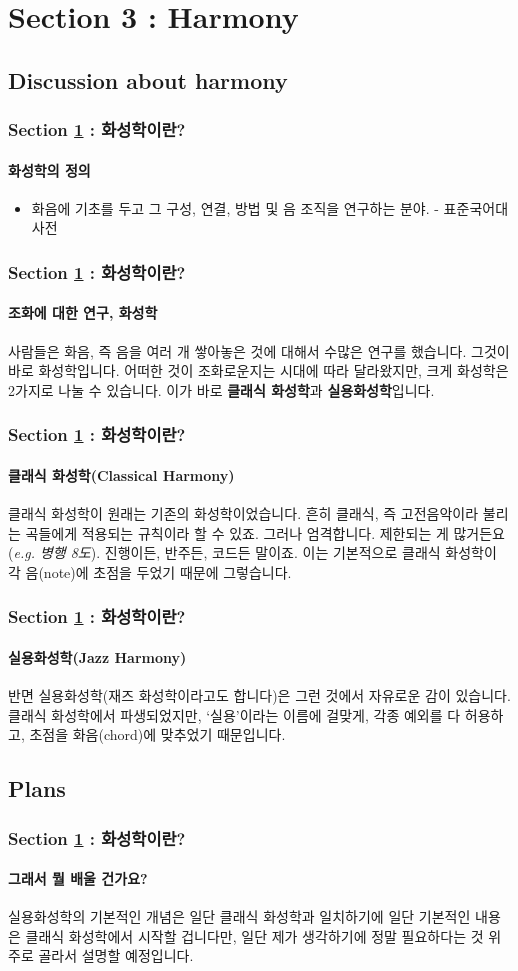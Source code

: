 \documentclass{beamer}
\begin{document}
	\section{Section 3 : Harmony}\label{sec:harmony}
	\subsection{Discussion about harmony}
	\begin{frame}
		\frametitle{Section \ref{sec:harmony} : 화성학이란?}
		\framesubtitle{화성학의 정의}
		\begin{definition}
			\begin{itemize}
				\item 화음에 기초를 두고 그 구성, 연결, 방법 및 음 조직을 연구하는 분야. - 표준국어대사전
			\end{itemize}
		\end{definition}
	\end{frame}
	
	\begin{frame}
		\frametitle{Section \ref{sec:harmony} : 화성학이란?}
		\framesubtitle{조화에 대한 연구, 화성학}
		사람들은 화음, 즉 음을 여러 개 쌓아놓은 것에 대해서 수많은 연구를 했습니다. 그것이 바로 화성학입니다. 어떠한 것이 조화로운지는 시대에 따라 달라왔지만, 크게 화성학은 2가지로 나눌 수 있습니다. 이가 바로 {\bf 클래식 화성학}과 {\bf 실용화성학}입니다.
	\end{frame}
	
	\begin{frame}
		\frametitle{Section \ref{sec:harmony} : 화성학이란?}
		\framesubtitle{클래식 화성학(Classical Harmony)}
		클래식 화성학이 원래는 기존의 화성학이었습니다. 흔히 클래식, 즉 고전음악이라 불리는 곡들에게 적용되는 규칙이라 할 수 있죠. 그러나 엄격합니다. 제한되는 게 많거든요({\it e.g. 병행 8도}). 진행이든, 반주든, 코드든 말이죠. 이는 기본적으로 클래식 화성학이 각 음(note)에 초점을 두었기 때문에 그렇습니다. 
	\end{frame}
	
	\begin{frame}
		\frametitle{Section \ref{sec:harmony} : 화성학이란?}
		\framesubtitle{실용화성학(Jazz Harmony)}
		반면 실용화성학(재즈 화성학이라고도 합니다)은 그런 것에서 자유로운 감이 있습니다. 클래식 화성학에서 파생되었지만, `실용'이라는 이름에 걸맞게, 각종 예외를 다 허용하고, 초점을 화음(chord)에 맞추었기 때문입니다.
	\end{frame}
	
	\subsection{Plans}
	\begin{frame}
		\frametitle{Section \ref{sec:harmony} : 화성학이란?}
		\framesubtitle{그래서 뭘 배울 건가요?}
		실용화성학의 기본적인 개념은 일단 클래식 화성학과 일치하기에 일단 기본적인 내용은 클래식 화성학에서 시작할 겁니다만, 일단 제가 생각하기에 정말 필요하다는 것 위주로 골라서 설명할 예정입니다.
	\end{frame}
	
\end{document}
